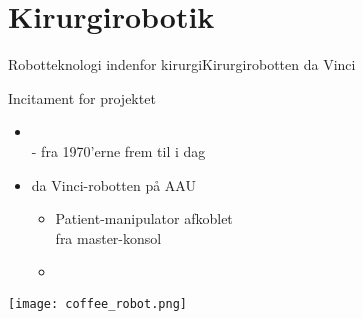 \section{Kirurgirobotik}
\begin{frame}{Robotteknologi indenfor kirurgi}{Kirurgirobotten da Vinci}
\vspace{8mm}
\begin{block}{Incitament for projektet}
	\begin{itemize}
		\item {} \\ \scriptsize{ - fra 1970'erne frem til i dag}\normalsize
		\item da Vinci-robotten på AAU
		\begin{itemize}
			\item Patient-manipulator afkoblet \\fra master-konsol
			\item {}
		\end{itemize}
	\end{itemize}
\end{block}
\begin{flushright}
	\vspace{-15mm}
\texttt{[image: coffee\_robot.png]}
\end{flushright}
\vspace{1cm}
\end{frame}

